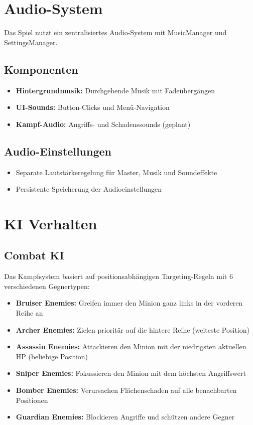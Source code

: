 \section{Audio-System}

Das Spiel nutzt ein zentralisiertes Audio-System mit MusicManager und SettingsManager.

\subsection{Komponenten}
\begin{itemize}
    \item \textbf{Hintergrundmusik:} Durchgehende Musik mit Fadeübergängen
    \item \textbf{UI-Sounds:} Button-Clicks und Menü-Navigation
    \item \textbf{Kampf-Audio:} Angriffs- und Schadenssounds (geplant)
\end{itemize}

\subsection{Audio-Einstellungen}
\begin{itemize}
    \item Separate Lautstärkeregelung für Master, Musik und Soundeffekte
    \item Persistente Speicherung der Audioeinstellungen
\end{itemize}

\section{KI Verhalten}

\subsection{Combat KI}
Das Kampfsystem basiert auf positionsabhängigen Targeting-Regeln mit 6 verschiedenen Gegnertypen:

\begin{itemize}
    \item \textbf{Bruiser Enemies:} Greifen immer den Minion ganz links in der vorderen Reihe an
    \item \textbf{Archer Enemies:} Zielen prioritär auf die hintere Reihe (weiteste Position)
    \item \textbf{Assassin Enemies:} Attackieren den Minion mit der niedrigsten aktuellen HP (beliebige Position)
    \item \textbf{Sniper Enemies:} Fokussieren den Minion mit dem höchsten Angriffswert
    \item \textbf{Bomber Enemies:} Verursachen Flächenschaden auf alle benachbarten Positionen
    \item \textbf{Guardian Enemies:} Blockieren Angriffe und schützen andere Gegner
\end{itemize}

